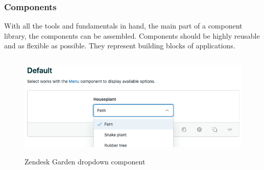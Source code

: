 \subsubsection{Components}
With all the tools and fundamentals in hand, the main part of a component library, the components can be assembled. Components should be highly reusable and as flexible as possible. They represent building blocks of applications.  \\
\begin{figure}[hbtp]
	\centerline{\includegraphics[height=5cm]{images/zendesk_component_example.png}}
	\caption{Zendesk Garden dropdown component \cite{zendesk_garden_zendesk_nodate}}
	\label{zen_garden_component}
\end{figure}

